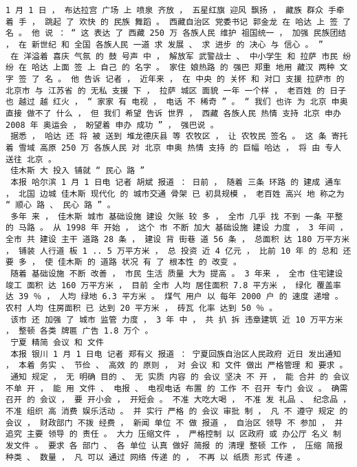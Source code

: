 \documentclass{article}
\begin{document}
\begin{Verbatim}[commandchars=\\\{\}]
 1 月 1 日 ， 布达拉宫 广场 上 喷泉 齐放 ， 五星红旗 迎风 飘扬 ， 藏族 群众 手牵着 手 ， 跳起 了 欢快 的 民族 舞蹈 。 西藏自治区 党委书记 郭金龙 在 哈达 上 签 了 名 。 他 说 ： “ 这 表达 了 西藏 250 万 各族人民 维护 祖国统一 ， 加强 民族团结 ， 在 新世纪 和 全国 各族人民 一道 求 发展 、 求 进步 的 决心 与 信心 。 ” 
 在 洋溢着 喜庆 气氛 的 鼓 号声 中 ， 解放军 武警战士 、 中小学生 和 拉萨 市民 纷纷 在 哈达 上面 签 上 自己 的 名字 。 家住 娘热路 的 强巴 郑重 地用 藏汉 两种 文字 签 了 名 。 他 告诉 记者 ， 近年来 ， 在 中央 的 关怀 和 对口 支援 拉萨市 的 北京市 与 江苏省 的 无私 支援 下 ， 拉萨 城区 面貌 一年 一个样 ， 老百姓 的 日子 也 越过 越 红火 ， “ 家家 有 电视 ， 电话 不 稀奇 ” 。 “ 我们 也许 为 北京 申奥 直接 做不了 什么 ， 但 我们 希望 告诉 世界 ， 西藏 各族人民 热情 支持 北京 申办 2008 年 奥运会 ， 盼望着 申办 成功 ” ， 强巴说 。 
 据悉 ， 哈达 还 将 被 送到 堆龙德庆县 等 农牧区 ， 让 农牧民 签名 。 这 条 寄托 着 雪域 高原 250 万 各族人民 对 北京 申奥 热情 支持 的 巨幅 哈达 ， 将 由 专人 送往 北京 。 
 佳木斯 大 投入 铺就 “ 民心 路 ” 
 本报 哈尔滨 1 月 1 日电 记者 胡斌 报道 ： 日前 ， 随着 三条 环路 的 建成 通车 ， 北国 边城 佳木斯 现代化 的 城市交通 骨架 已 初具规模 ， 老百姓 高兴 地 称之为 “ 顺心 路 、 民心 路 ” 。 
 多年 来 ， 佳木斯 城市 基础设施 建设 欠账 较 多 ， 全市 几乎 找 不到 一条 平整 的 马路 。 从 1998 年 开始 ， 这个 市 不断 加大 基础设施 建设 力度 ， 3 年间 ， 全市 共 建设 主干 道路 28 条 ， 建设 背 街巷 道 56 条 ， 总面积 达 180 万平方米 ， 铺装 人行道 板 1 .. 5 万平方米 ， 总 投资 近 4 亿元 ， 比前 10 年 的 总和 还要 多 ， 使 佳木斯 的 道路 状况 有 了 根本性 的 改变 。 
 随着 基础设施 不断 改善 ， 市民 生活 质量 大为 提高 。 3 年来 ， 全市 住宅建设 竣工 面积 达 160 万平方米 ， 目前 全市 人均 居住面积 7.8 平方米 ， 绿化 覆盖率 达 39 ％ ， 人均 绿地 6.3 平方米 。 煤气 用户 以 每年 2000 户 的 速度 递增 。 农村 人均 住房面积 已 达到 20 平方米 ， 砖瓦 化率 达到 50 ％ 。 
 该市 还 加强 了 城市 监管 力度 ， 3 年 中 ， 共 扒 拆 违章建筑 近 10 万平方米 ， 整顿 各类 牌匾 广告 1.8 万个 。 
 宁夏 精简 会议 和 文件 
 本报 银川 1 月 1 日电 记者 郑有义 报道 ： 宁夏回族自治区人民政府 近日 发出通知 ， 本着 务实 、 节俭 、 高效 的 原则 ， 对 会议 和 文件 做出 严格管理 和 要求 。 
 通知 规定 ， 无 明确 目的 、 无 实质 内容 的 会议 坚决 不 开 ， 能 合并 的 会议 不单 开 ， 能 用 文件 、 电报 、 电视电话 布置 的 工作 不 召开 专门 会议 。 确需 召开 的 会议 ， 要 开小会 ， 开短会 。 不准 大吃大喝 ， 不准 发 礼品 、 纪念品 ， 不准 组织 高 消费 娱乐活动 。 并 实行 严格 的 会议 审批 制 ， 凡 不 遵守 规定 的 会议 ， 财政部门 不拨 经费 ， 新闻 单位 不 做 报道 ， 自治区 领导 不 参加 ， 并 追究 主要 领导 的 责任 。 大力 压缩文件 ， 严格控制 以 区政府 或 办公厅 名义 制 发文件 。 要求 各 部门 、 各 单位 认真 做好 简报 的 清理 整顿 工作 ， 压缩 简报 种类 、 数量 ， 凡 可以 通过 网络 传递 的 ， 不再 以 纸质 形式 传递 。 

\end{Verbatim}
\end{document}
